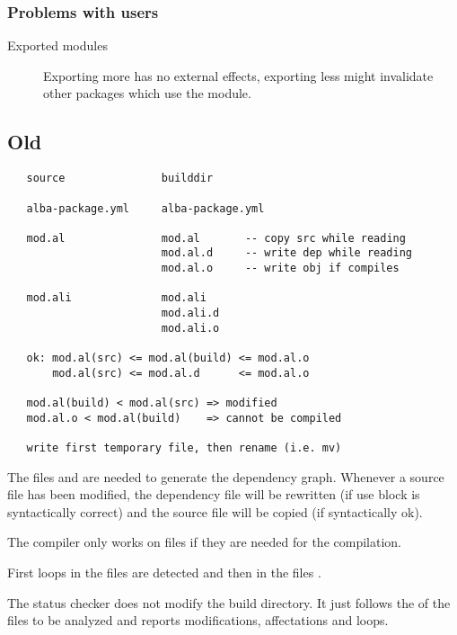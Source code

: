 \subsubsection{Problems with users}
\begin{description}

\item[Exported modules] Exporting more has no external effects, exporting less
  might invalidate other packages which use the module.

\end{description}


\subsection{Old}

{\small
\begin{verbatim}
   source               builddir

   alba-package.yml     alba-package.yml

   mod.al               mod.al       -- copy src while reading
                        mod.al.d     -- write dep while reading
                        mod.al.o     -- write obj if compiles

   mod.ali              mod.ali
                        mod.ali.d
                        mod.ali.o

   ok: mod.al(src) <= mod.al(build) <= mod.al.o
       mod.al(src) <= mod.al.d      <= mod.al.o

   mod.al(build) < mod.al(src) => modified
   mod.al.o < mod.al(build)    => cannot be compiled

   write first temporary file, then rename (i.e. mv)
\end{verbatim}
}

The files  and  are needed to
generate the dependency graph. Whenever a source file has been modified, the
dependency file will be rewritten (if use block is syntactically correct) and
the source file will be copied (if syntactically ok).

The compiler only works on files if they are needed for the compilation.

First loops in the files  are detected and then in the
files .


The status checker does not modify the build directory. It just follows the
 of the files to be analyzed and reports modifications,
affectations and loops.

